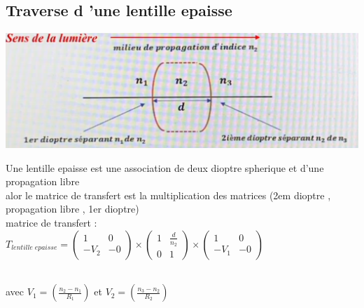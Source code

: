 \documentclass[12pt]{book}
\begin{document}
        \subsection{Traverse d 'une lentille epaisse}
            \begin{center}
                \includegraphics[width = 0.6\linewidth]{pic/lentilleepaisse.png}
            \end{center}
            Une lentille epaisse est une association de deux dioptre spherique et d'une propagation libre  \\
            alor le matrice de transfert est la  multiplication des matrices (2em dioptre , propagation libre , 1er dioptre)
            \\
            matrice de transfert : 
            $
            T_{lentille \; epaisse}= 
            \begin{pmatrix}
                1 & 0 \\
                -V_2& -0
            \end{pmatrix} \times
            \begin{pmatrix}
                1 & \frac{d}{n_2}\\
                0 & 1
            \end{pmatrix} \times
            \begin{pmatrix}
                1 & 0 \\
                -V_1& -0
            \end{pmatrix}
            $          
            \begin{center}
                 \\ avec $V_1 = (\frac{n_2 - n_1}{R_1})$ et $V_2 = (\frac{n_3 - n_2}{R_2})$
            \end{center} 
\end{document}
